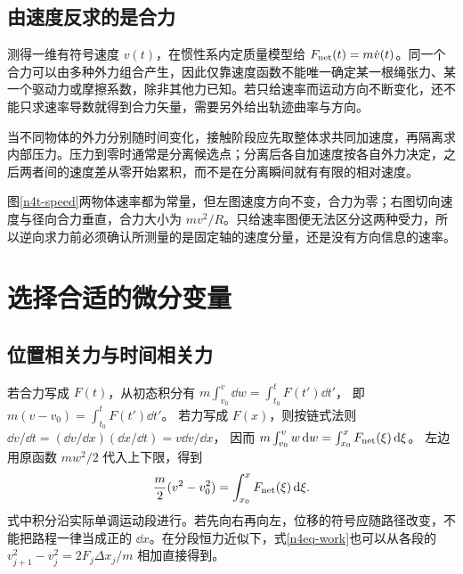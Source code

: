 \subsection{由速度反求的是合力}
测得一维有符号速度 $v(t)$，在惯性系内定质量模型给 $F_{\rm net}(t)=m\dot v(t)$。同一个合力可以由多种外力组合产生，因此仅靠速度函数不能唯一确定某一根绳张力、某一个驱动力或摩擦系数，除非其他力已知。若只给速率而运动方向不断变化，还不能只求速率导数就得到合力矢量，需要另外给出轨迹曲率与方向。

当不同物体的外力分别随时间变化，接触阶段应先取整体求共同加速度，再隔离求内部压力。压力到零时通常是分离候选点；分离后各自加速度按各自外力决定，之后两者间的速度差从零开始累积，而不是在分离瞬间就有有限的相对速度。

图\ref{n4t-speed}两物体速率都为常量，但左图速度方向不变，合力为零；右图切向速度与径向合力垂直，合力大小为 $mv^2/R$。只给速率图便无法区分这两种受力，所以逆向求力前必须确认所测量的是固定轴的速度分量，还是没有方向信息的速率。

\section{选择合适的微分变量}
\subsection{位置相关力与时间相关力}
若合力写成 $F(t)$，从初态积分有
$m\int_{v_0}^{v}\dd w=\int_{t_0}^{t}F(t')\dd t'$，
即 $m(v-v_0)=\int_{t_0}^{t}F(t')\dd t'$。
若力写成 $F(x)$，则按链式法则
$\dd v/\dd t=(\dd v/\dd x)(\dd x/\dd t)=v\dd v/\dd x$，
因而
$m\int_{v_0}^{v}w\mathop{}\!\mathrm d w=\int_{x_0}^{x}F_{\rm net}(\xi)\mathop{}\!\mathrm d\xi$。
左边用原函数 $mw^2/2$ 代入上下限，得到
\begin{equation}\label{n4eq-work}
\frac m2(v^2-v_0^2)=\int_{x_0}^xF_{\rm net}(\xi)\mathop{}\!\mathrm d\xi.
\end{equation}
式中积分沿实际单调运动段进行。若先向右再向左，位移的符号应随路径改变，不能把路程一律当成正的 $\dd x$。在分段恒力近似下，式\eqref{n4eq-work}也可以从各段的 $v_{j+1}^2-v_j^2=2F_j\Delta x_j/m$ 相加直接得到。

